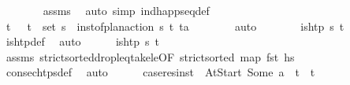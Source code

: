 \begin{isabellebody}
\ \ \ \ \ \ \isamarkupfalse%
\ assms\ \isamarkupfalse%
\ {\isacharparenleft}{\kern0pt}auto\ simp{\isacharcolon}{\kern0pt}\ ind{\isacharunderscore}{\kern0pt}happ{\isacharunderscore}{\kern0pt}seq{\isacharunderscore}{\kern0pt}def{\isacharparenright}{\kern0pt}\isanewline
\ \ \ \ \isamarkupfalse%
\ \isamarkupfalse%
\ t\isactrlsub {\isasympi}\ {\isasympi}\ \ {\isachardoublequoteopen}{\isacharparenleft}{\kern0pt}t\isactrlsub {\isasympi}{\isacharcomma}{\kern0pt}{\isasympi}{\isacharparenright}{\kern0pt}\ {\isasymin}\ set\ {\isasympi}s{\isachardoublequoteclose}\ \ {\isachardoublequoteopen}inst{\isacharunderscore}{\kern0pt}of{\isacharunderscore}{\kern0pt}plan{\isacharunderscore}{\kern0pt}action\ {\isasympi}s\ {\isacharparenleft}{\kern0pt}t\isactrlsub {\isasympi}{\isacharcomma}{\kern0pt}{\isasympi}{\isacharparenright}{\kern0pt}\ {\isacharparenleft}{\kern0pt}t{\isacharcomma}{\kern0pt}a{\isacharparenright}{\kern0pt}{\isachardoublequoteclose}\isanewline
\ \ \ \ \ \ \isamarkupfalse%
\ auto\isanewline
\ \ \ \ \isamarkupfalse%
\ \isamarkupfalse%
\ {\isachardoublequoteopen}is{\isacharunderscore}{\kern0pt}htp\ {\isasympi}s\ t\isactrlsub {\isasympi}{\isachardoublequoteclose}\isanewline
\ \ \ \ \ \ \isamarkupfalse%
\ is{\isacharunderscore}{\kern0pt}htp{\isacharunderscore}{\kern0pt}def\ \isamarkupfalse%
\ auto\isanewline
\ \ \ \ \isamarkupfalse%
\ {\isachardoublequoteopen}{\isasymnot}is{\isacharunderscore}{\kern0pt}htp\ {\isasympi}s\ t{\isachardoublequoteclose}\isanewline
\ \ \ \ \ \ \isamarkupfalse%
\ assms\ strict{\isacharunderscore}{\kern0pt}sorted{\isacharunderscore}{\kern0pt}drop{\isacharunderscore}{\kern0pt}leq{\isacharunderscore}{\kern0pt}take{\isacharunderscore}{\kern0pt}le{\isacharprime}{\kern0pt}{\isacharbrackleft}{\kern0pt}OF\ {\isacartoucheopen}strict{\isacharunderscore}{\kern0pt}sorted\ {\isacharparenleft}{\kern0pt}map\ fst\ hs{\isacharparenright}{\kern0pt}{\isacartoucheclose}{\isacharbrackright}{\kern0pt}\ \isanewline
\ \ \ \ \ \ \isamarkupfalse%
\ consec{\isacharunderscore}{\kern0pt}htps{\isacharunderscore}{\kern0pt}def\ \isamarkupfalse%
\ auto\isanewline
\ \ \ \ \isamarkupfalse%
\ {\isacharquery}{\kern0pt}case{}{\isacharequal}{\kern0pt}{\isachardoublequoteopen}res{\isacharunderscore}{\kern0pt}inst\ {\isasympi}\ At{\isacharunderscore}{\kern0pt}Start{\isacharequal}{\kern0pt}\ Some\ a\ {\isasymand}\ t\isactrlsub {\isasympi}\ {\isacharequal}{\kern0pt}\ t{\isachardoublequoteclose}\isanewline

\end{isabellebody}
